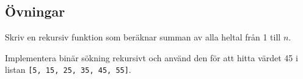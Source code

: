 \subsection{Övningar}
\begin{exercise}
Skriv en rekursiv funktion som beräknar summan av alla heltal från 1 till \( n \).
\end{exercise}

\begin{exercise}
Implementera binär sökning rekursivt och använd den för att hitta värdet 45 i listan \texttt{[5, 15, 25, 35, 45, 55]}.
\end{exercise}

